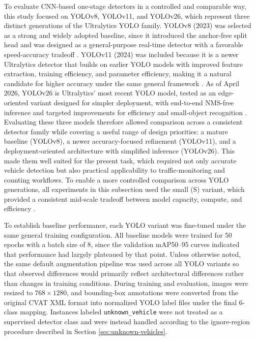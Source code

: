 To evaluate CNN-based one-stage detectors in a controlled and comparable way, 
this study focused on YOLOv8, YOLOv11, and YOLOv26, which represent three distinct 
generations of the Ultralytics YOLO family. YOLOv8 (2023) was selected as a strong and 
widely adopted baseline, since it introduced the anchor-free split head and was 
designed as a general-purpose real-time detector with a favorable speed-accuracy 
tradeoff \cite{yolov8_ultralytics, ultralytics_yolov8_vs_yolov11}. 
YOLOv11 (2024) was included because it is a newer Ultralytics detector that builds 
on earlier YOLO models with improved feature extraction, training efficiency, and 
parameter efficiency, making it a natural candidate for higher accuracy under 
the same general framework \cite{yolo11_ultralytics, ultralytics_yolov8_vs_yolov11}. 
As of April 2026, YOLOv26 is Ultralytics' most recent YOLO model, tested as an 
edge-oriented variant designed for simpler deployment, with end-to-end NMS-free 
inference and targeted improvements for efficiency and small-object recognition 
\cite{yolo26_ultralytics, ultralytics_yolov8_vs_yolov11}. 
Evaluating these three models therefore allowed comparison across a 
consistent detector family while covering a useful range of design priorities: 
a mature baseline (YOLOv8), a newer accuracy-focused refinement (YOLOv11), and a
deployment-oriented architecture with simplified inference (YOLOv26). This made 
them well suited for the present task, which required not only accurate vehicle 
detection but also practical applicability to traffic-monitoring and counting 
workflows. To enable a more controlled comparison across YOLO generations, all 
experiments in this subsection used the small (S) variant, which provided a 
consistent mid-scale tradeoff between model capacity, compute, and efficiency 
\cite{ultralytics_coco}.

To establish baseline performance, each YOLO variant was fine-tuned under the 
same general training configuration. All baseline models were trained for 50 
epochs with a batch size of 8, since the validation mAP50--95 curves indicated that 
performance had largely plateaued by that point. Unless otherwise noted, the 
same default augmentation pipeline was used across all YOLO variants so that 
observed differences would primarily reflect architectural differences rather 
than changes in training conditions. During training and evaluation, images 
were resized to $768 \times 1280$, and bounding-box annotations were converted from 
the original CVAT XML format into normalized YOLO label files under the final 
6-class mapping. Instances labeled \verb|unknown_vehicle| were not treated as 
a supervised detector class and were instead handled according to the ignore-region
procedure described in Section \ref{sec:unknown-vehicles}.

